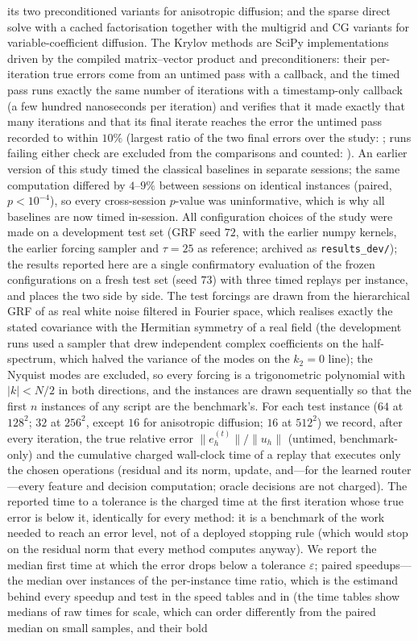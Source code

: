 its two preconditioned variants for anisotropic diffusion; and the sparse direct solve with a cached factorisation together with the multigrid and CG variants for variable-coefficient diffusion. The Krylov methods are SciPy implementations driven by the compiled matrix--vector product and preconditioners: their per-iteration true errors come from an untimed pass with a callback, and the timed pass runs exactly the same number of iterations with a timestamp-only callback (a few hundred nanoseconds per iteration) and verifies that it made exactly that many iterations and that its final iterate reaches the error the untimed pass recorded to within $10\%$ (largest ratio of the two final errors over the study: \caKrylovCheckMax; runs failing either check are excluded from the comparisons and counted: \caKrylovInvalid). An earlier version of this study timed the classical baselines in separate sessions; the same computation differed by $4$--$9\%$ between sessions on identical instances (paired, $p < 10^{-4}$), so every cross-session $p$-value was uninformative, which is why all baselines are now timed in-session. All configuration choices of the study were made on a development test set (GRF seed $72$, with the earlier numpy kernels, the earlier forcing sampler and $\tau = 25$ as reference; archived as \texttt{results\_dev/}); the results reported here are a single confirmatory evaluation of the frozen configurations on a fresh test set (seed $73$) with three timed replays per instance, and  places the two side by side. The test forcings are drawn from the hierarchical GRF of  as real white noise filtered in Fourier space, which realises exactly the stated covariance with the Hermitian symmetry of a real field (the development runs used a sampler that drew independent complex coefficients on the half-spectrum, which halved the variance of the modes on the $k_2 = 0$ line); the Nyquist modes are excluded, so every forcing is a trigonometric polynomial with $|k| < N/2$ in both directions, and the instances are drawn sequentially so that the first $n$ instances of any script are the benchmark's. For each test instance ($64$ at $128^2$; $32$ at $256^2$, except $16$ for anisotropic diffusion; $16$ at $512^2$) we record, after every iteration, the true relative error $\|e^{(t)}_h\|/\|u_h\|$ (untimed, benchmark-only) and the cumulative charged wall-clock time of a replay that executes only the chosen operations (residual and its norm, update, and---for the learned router---every feature and decision computation; oracle decisions are not charged). The reported time to a tolerance is the charged time at the first iteration whose true error is below it, identically for every method: it is a benchmark of the work needed to reach an error level, not of a deployed stopping rule (which would stop on the residual norm that every method computes anyway). We report the median first time at which the error drops below a tolerance $\varepsilon$; paired speedups---the median over instances of the per-instance time ratio, which is the estimand behind every speedup and test in the speed tables and in  (the time tables show medians of raw times for scale, which can order differently from the paired median on small samples, and their bold 